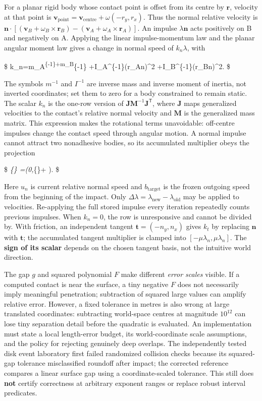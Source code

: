 For a planar rigid body whose contact point is offset from its centre by \(\mathbf r\), velocity at that point is \(\mathbf v_{\text{point}}=\mathbf v_{\text{centre}}+\omega(-r_y,r_x)\). Thus the normal relative velocity is \(\mathbf n\cdot[(\mathbf v_B+\omega_B\times\mathbf r_B)-(\mathbf v_A+\omega_A\times\mathbf r_A)]\). An impulse \(\lambda\mathbf n\) acts positively on B and negatively on A. Applying the linear impulse-momentum law and the planar angular moment law gives a change in normal speed of \(k_n\lambda\), with

\$ k\_n=m\_A\textsuperscript{\{-1\}+m\_B}\{-1\} +I\_A\^{}\{-1\}(\mathbf r\_A\times\mathbf n)\^{}2 +I\_B\^{}\{-1\}(\mathbf r\_B\times\mathbf n)\^{}2. \$

The symbols \(m^{-1}\) and \(I^{-1}\) are inverse mass and inverse moment of inertia, not inverted coordinates; set them to zero for a body constrained to remain static. The scalar \(k_n\) is the one-row version of \(\mathbf J\mathbf M^{-1}\mathbf J^\mathsf T\), where \(\mathbf J\) maps generalized velocities to the contact's relative normal velocity and \(\mathbf M\) is the generalized mass matrix. This expression makes the rotational terms unavoidable: off-centre impulses change the contact speed through angular motion. A normal impulse cannot attract two nonadhesive bodies, so its accumulated multiplier obeys the projection

\$ \lambda\emph{\{\} =\max\left(0,\lambda}\{\}+ \right). \$

Here \(u_n\) is current relative normal speed and \(b_{\mathrm{target}}\) is the frozen outgoing speed from the beginning of the impact. Only \(\Delta\lambda=\lambda_{\mathrm{new}}-\lambda_{\mathrm{old}}\) may be applied to velocities. Re-applying the full stored impulse every iteration repeatedly counts previous impulses. When \(k_n=0\), the row is unresponsive and cannot be divided by. With friction, an independent tangent \(\mathbf t=(-n_y,n_x)\) gives \(k_t\) by replacing \(\mathbf n\) with \(\mathbf t\); the accumulated tangent multiplier is clamped into \([-\mu\lambda_n,\mu\lambda_n]\). The \textbf{sign of its scalar} depends on the chosen tangent basis, not the intuitive world direction.

The gap \(g\) and squared polynomial \(F\) make different \emph{error scales} visible. If a computed contact is near the surface, a tiny negative \(F\) does not necessarily imply meaningful penetration; subtraction of squared large values can amplify relative error. However, a fixed tolerance in metres is also wrong at large translated coordinates: subtracting world-space centres at magnitude \(10^{12}\) can lose tiny separation detail before the quadratic is evaluated. An implementation must state a local length-error budget, its world-coordinate scale assumptions, and the policy for rejecting genuinely deep overlaps. The independently tested disk event laboratory first failed randomized collision checks because its squared-gap tolerance misclassified roundoff after impact; the corrected reference compares a linear surface gap using a coordinate-scaled tolerance. This still does \textbf{not} certify correctness at arbitrary exponent ranges or replace robust interval predicates.

